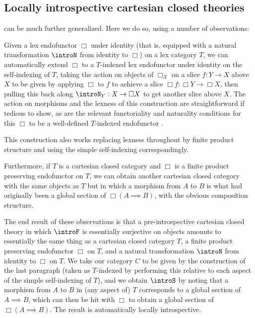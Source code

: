 \subsection{Locally introspective cartesian closed theories}
\begin{observation}\label{CartesianClosedLocallyIntrosp}
 can be much further generalized. Here we do so, using a number of observations:

Given a lex endofunctor $\Box$ under identity (that is, equipped with a natural transformation $\introN$ from identity to $\Box$) on a lex category $T$, we can automatically extend $\Box$ to a $T$-indexed lex endofunctor under identity on the self-indexing of $T$, taking the action on objects of $\Box_X$ on a slice $f : Y \to X$ above $X$ to be given by applying $\Box$ to $f$ to achieve a slice $\Box f : \Box Y \to \Box X$, then pulling this back along $\introN_Y : X \to \Box X$ to get another slice above $X$. The action on morphisms and the lexness of this construction are straightforward if tedious to show, as are the relevant functoriality and naturality conditions for this $\Box$ to be a well-defined $T$-indexed endofunctor \TODO.

This construction also works replacing lexness throughout by finite product structure and using the simple self-indexing correspondingly.

Furthermore, if $T$ is a cartesian closed category and $\Box$ is a finite product preserving endofunctor on $T$, we can obtain another cartesian closed category with the same objects as $T$ but in which a morphism from $A$ to $B$ is what had originally been a global section of $\Box (A \implies B)$, with the obvious composition structure.

The end result of these observations is that a pre-introspective cartesian closed theory in which $\introF$ is essentially surjective on objects amounts to essentially the same thing as a cartesian closed category $T$, a finite product preserving endofunctor $\Box$ on $T$, and a natural transformation $\introN$ from identity to $\Box$ on $T$. We take our category $C$ to be given by the construction of the last paragraph (taken as $T$-indexed by performing this relative to each aspect of the simple self-indexing of $T$), and we obtain $\introS$ by noting that a morphism from $A$ to $B$ in (any aspect of) $T$ corresponds to a global section of $A \implies B$, which can then be hit with $\Box$ to obtain a global section of $\Box (A \implies B)$. The result is automatically locally introspective.


\end{observation}
